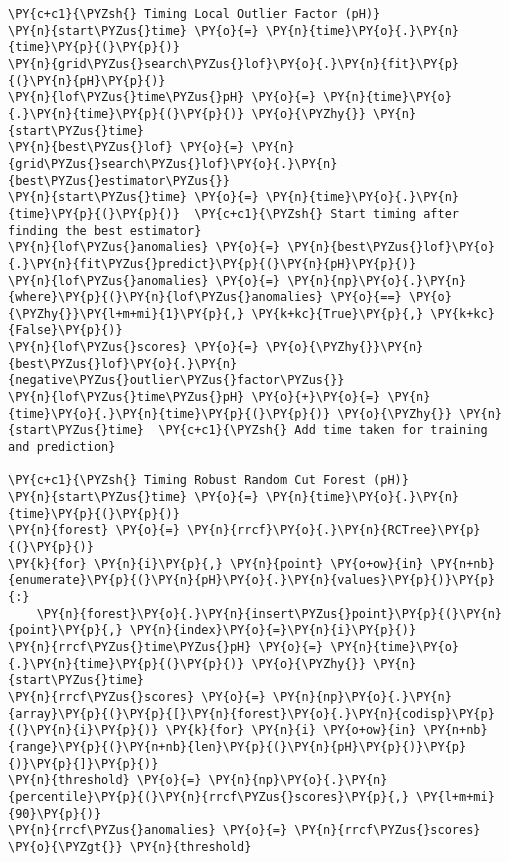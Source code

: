 \begin{tcolorbox}[breakable, size=fbox, boxrule=1pt, pad at break*=1mm,colback=cellbackground, colframe=cellborder]
\begin{Verbatim}[commandchars=\\\{\}]
\PY{c+c1}{\PYZsh{} Timing Local Outlier Factor (pH)}
\PY{n}{start\PYZus{}time} \PY{o}{=} \PY{n}{time}\PY{o}{.}\PY{n}{time}\PY{p}{(}\PY{p}{)}
\PY{n}{grid\PYZus{}search\PYZus{}lof}\PY{o}{.}\PY{n}{fit}\PY{p}{(}\PY{n}{pH}\PY{p}{)}
\PY{n}{lof\PYZus{}time\PYZus{}pH} \PY{o}{=} \PY{n}{time}\PY{o}{.}\PY{n}{time}\PY{p}{(}\PY{p}{)} \PY{o}{\PYZhy{}} \PY{n}{start\PYZus{}time}
\PY{n}{best\PYZus{}lof} \PY{o}{=} \PY{n}{grid\PYZus{}search\PYZus{}lof}\PY{o}{.}\PY{n}{best\PYZus{}estimator\PYZus{}}
\PY{n}{start\PYZus{}time} \PY{o}{=} \PY{n}{time}\PY{o}{.}\PY{n}{time}\PY{p}{(}\PY{p}{)}  \PY{c+c1}{\PYZsh{} Start timing after finding the best estimator}
\PY{n}{lof\PYZus{}anomalies} \PY{o}{=} \PY{n}{best\PYZus{}lof}\PY{o}{.}\PY{n}{fit\PYZus{}predict}\PY{p}{(}\PY{n}{pH}\PY{p}{)}
\PY{n}{lof\PYZus{}anomalies} \PY{o}{=} \PY{n}{np}\PY{o}{.}\PY{n}{where}\PY{p}{(}\PY{n}{lof\PYZus{}anomalies} \PY{o}{==} \PY{o}{\PYZhy{}}\PY{l+m+mi}{1}\PY{p}{,} \PY{k+kc}{True}\PY{p}{,} \PY{k+kc}{False}\PY{p}{)}
\PY{n}{lof\PYZus{}scores} \PY{o}{=} \PY{o}{\PYZhy{}}\PY{n}{best\PYZus{}lof}\PY{o}{.}\PY{n}{negative\PYZus{}outlier\PYZus{}factor\PYZus{}}
\PY{n}{lof\PYZus{}time\PYZus{}pH} \PY{o}{+}\PY{o}{=} \PY{n}{time}\PY{o}{.}\PY{n}{time}\PY{p}{(}\PY{p}{)} \PY{o}{\PYZhy{}} \PY{n}{start\PYZus{}time}  \PY{c+c1}{\PYZsh{} Add time taken for training and prediction}

\PY{c+c1}{\PYZsh{} Timing Robust Random Cut Forest (pH)}
\PY{n}{start\PYZus{}time} \PY{o}{=} \PY{n}{time}\PY{o}{.}\PY{n}{time}\PY{p}{(}\PY{p}{)}
\PY{n}{forest} \PY{o}{=} \PY{n}{rrcf}\PY{o}{.}\PY{n}{RCTree}\PY{p}{(}\PY{p}{)}
\PY{k}{for} \PY{n}{i}\PY{p}{,} \PY{n}{point} \PY{o+ow}{in} \PY{n+nb}{enumerate}\PY{p}{(}\PY{n}{pH}\PY{o}{.}\PY{n}{values}\PY{p}{)}\PY{p}{:}
    \PY{n}{forest}\PY{o}{.}\PY{n}{insert\PYZus{}point}\PY{p}{(}\PY{n}{point}\PY{p}{,} \PY{n}{index}\PY{o}{=}\PY{n}{i}\PY{p}{)}
\PY{n}{rrcf\PYZus{}time\PYZus{}pH} \PY{o}{=} \PY{n}{time}\PY{o}{.}\PY{n}{time}\PY{p}{(}\PY{p}{)} \PY{o}{\PYZhy{}} \PY{n}{start\PYZus{}time}
\PY{n}{rrcf\PYZus{}scores} \PY{o}{=} \PY{n}{np}\PY{o}{.}\PY{n}{array}\PY{p}{(}\PY{p}{[}\PY{n}{forest}\PY{o}{.}\PY{n}{codisp}\PY{p}{(}\PY{n}{i}\PY{p}{)} \PY{k}{for} \PY{n}{i} \PY{o+ow}{in} \PY{n+nb}{range}\PY{p}{(}\PY{n+nb}{len}\PY{p}{(}\PY{n}{pH}\PY{p}{)}\PY{p}{)}\PY{p}{]}\PY{p}{)}
\PY{n}{threshold} \PY{o}{=} \PY{n}{np}\PY{o}{.}\PY{n}{percentile}\PY{p}{(}\PY{n}{rrcf\PYZus{}scores}\PY{p}{,} \PY{l+m+mi}{90}\PY{p}{)}
\PY{n}{rrcf\PYZus{}anomalies} \PY{o}{=} \PY{n}{rrcf\PYZus{}scores} \PY{o}{\PYZgt{}} \PY{n}{threshold}


\end{Verbatim}
\end{tcolorbox}
